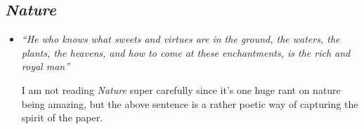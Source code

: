 \documentclass[12pt]{article}
\begin{document}
\subsection{\emph{Nature}}

\begin{itemize}
    \item \emph{``He who knows what sweets and virtues are in the ground, the
        waters, the plants, the heavens, and how to come at these enchantments,
        is the rich and royal man''}

        I am not reading \emph{Nature} super carefully since it's one huge rant
        on nature being amazing, but the above sentence is a rather poetic way
        of capturing the spirit of the paper.
\end{itemize}
\end{document}
